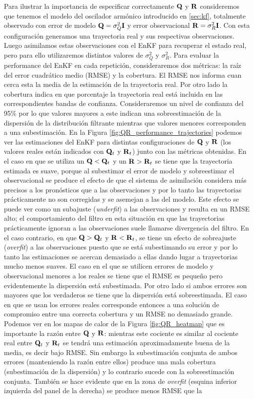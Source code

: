 Para ilustrar la importancia de especificar correctamente $\mathbf{Q}$ y $\mathbf{R}$ consideremos que tenemos el modelo del oscilador armónico introducido en \ref{sec:kf}, totalmente observado con error de modelo $\mathbf{Q} = \sigma_Q^2 \mathbf{I}$ y error observacional $\mathbf{R} = \sigma_R^2 \mathbf{I}$. Con esta configuración generamos una trayectoria real y sus respectivas observaciones. Luego asimilamos estas observaciones con el EnKF para recuperar el estado real, pero para ello utilizaremos distintos valores de $\sigma_Q^2$ y $\sigma_R^2$. Para evaluar la performance del EnKF en cada repetición, consideraremos dos métricas: la raíz del error cuadrático medio (RMSE) y la cobertura. El RMSE nos informa cuan cerca esta la media de la estimación de la trayectoria real. Por otro lado la cobertura indica en que porcentaje la trayectoria real está incluida en las correspondientes bandas de confianza. Consideraremos un nivel de confianza del 95\% por lo que valores mayores a este indican una sobreestimación de la dispersión de la distribución filtrante mientras que valores menores corresponden a una subestimación. En la Figura \ref{fig:QR_performance_trajectories} podemos ver las estimaciones del EnKF para distintas configuraciones de $\mathbf{Q}$ y $\mathbf{R}$ (los valores reales están indicados con $\mathbf{Q}_t$ y $\mathbf{R}_t$) junto con las métricas obtenidas. En el caso en que se utiliza un $\mathbf{Q} < \mathbf{Q}_t$ y un $\mathbf{R} > \mathbf{R}_t$ se tiene que la trayectoria estimada es suave, porque al subestimar el error de modelo y sobreestimar el observacional se produce el efecto de que el sistema de asimilación considera más precisos a los pronósticos que a las observaciones y por lo tanto las trayectorias prácticamente no son corregidas y se asemejan a las del modelo. Este efecto se puede ver como un subajuste (\textit{underfit}) a las observaciones y resulta en un RMSE alto; el comportamiento del filtro en esta situación en que las trayectorias prácticamente ignoran a las observaciones suele llamarse divergencia del filtro. En el caso contrario, en que $\mathbf{Q} > \mathbf{Q}_t$ y $\mathbf{R} < \mathbf{R}_t$, se tiene un efecto de sobreajuste (\textit{overfit}) a las observaciones puesto que se está subestimando su error y por lo tanto las estimaciones se acercan demasiado a ellas dando lugar a trayectorias mucho menos suaves. El caso en el que se utilicen errores de modelo y observacional menores a los reales se tiene que el RMSE es pequeño pero evidentemente la dispersión está subestimada. Por otro lado si ambos errores son mayores que los verdaderos se tiene que la dispersión está sobreestimada. El caso en que se usan los errores reales corresponde entonces a una solución de compromiso entre una correcta cobertura y un RMSE no demasiado grande. Podemos ver en los mapas de calor de la Figura \ref{fig:QR_heatmap} que es importante la razón entre $\mathbf{Q}$ y $\mathbf{R}$: mientras este cociente es similar al cociente real entre $\mathbf{Q}_t$ y $\mathbf{R}_t$ se tendrá una estimación aproximadamente buena de la media, es decir bajo RMSE. Sin embargo la subestimación conjunta de ambos errores (manteniendo la razón entre ellos) produce una mala cobertura (subestimación de la dispersión) y lo contrario sucede con la sobreestimación conjunta. También se hace evidente que en la zona de \textit{overfit} (esquina inferior izquierda del panel de la derecha) se produce menos RMSE que la 